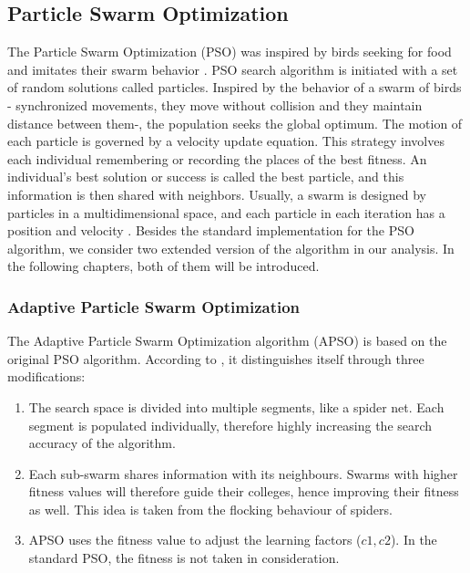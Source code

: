 \documentclass[conference]{IEEEtran}
\begin{document}
	\subsection{Particle Swarm Optimization}
    The Particle Swarm Optimization (PSO) was inspired by birds seeking for food and imitates their swarm behavior \cite{abraham2007swarm, messac2015optimization}. PSO search algorithm is initiated with a set of random solutions called particles. Inspired by the behavior of a swarm of birds - synchronized movements, they move without collision and they maintain distance between them-, the population seeks the global optimum. The motion of each particle is governed by a velocity update equation. This strategy involves each individual remembering or recording the places of the best fitness. An individual's best solution or success is called the best particle, and this information is then shared with neighbors. Usually, a swarm is designed by particles in a multidimensional space, and each particle in each iteration has a position and velocity \cite{abraham2007swarm, messac2015optimization}. Besides the standard implementation for the PSO algorithm, we consider two extended version of the algorithm in our analysis. In the following chapters, both of them will be introduced.

	\subsubsection{Adaptive Particle Swarm Optimization}
	The Adaptive Particle Swarm Optimization algorithm (APSO) is based on the original PSO algorithm. According to \cite{apso2009}, it distinguishes itself through three modifications:
	\begin{enumerate}
        \item The search space is divided into multiple segments, like a spider net. Each segment is populated individually, therefore highly increasing the search accuracy of the algorithm.
        \item Each sub-swarm shares information with its neighbours. Swarms with higher fitness values will therefore guide their colleges, hence improving their fitness as well. This idea is taken from the flocking behaviour of spiders.
        \item APSO uses the fitness value to adjust the learning factors ($c1, c2$). In the standard PSO, the fitness is not taken in consideration.
    \end{enumerate}
\end{document}
